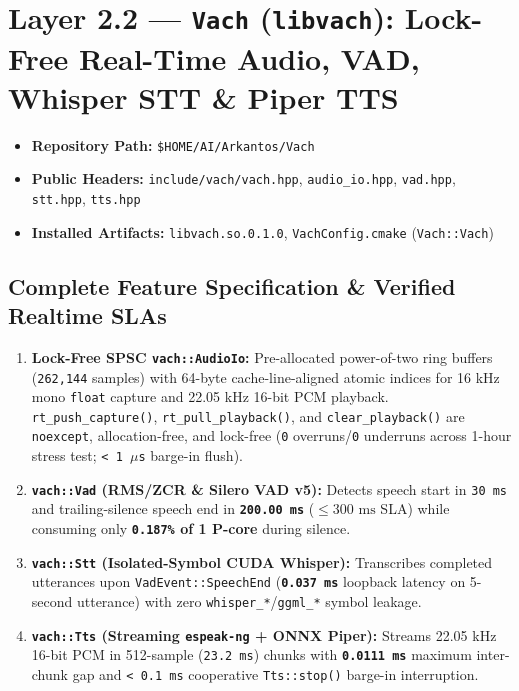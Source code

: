 \documentclass[11pt,a4paper]{article}
\begin{document}
\section{Layer 2.2 --- \texttt{Vach} (\texttt{libvach}): Lock-Free Real-Time Audio, VAD, Whisper STT \& Piper TTS}

\begin{itemize}[leftmargin=1.5em,itemsep=1pt]
  \item \textbf{Repository Path:} \texttt{\$HOME/AI/Arkantos/Vach}
  \item \textbf{Public Headers:} \texttt{include/vach/vach.hpp}, \texttt{audio\_io.hpp}, \texttt{vad.hpp}, \texttt{stt.hpp}, \texttt{tts.hpp}
  \item \textbf{Installed Artifacts:} \texttt{libvach.so.0.1.0}, \texttt{VachConfig.cmake} (\texttt{Vach::Vach})
\end{itemize}

\subsection{Complete Feature Specification \& Verified Realtime SLAs}
\begin{enumerate}[leftmargin=1.5em]
  \item \textbf{Lock-Free SPSC \texttt{vach::AudioIo}:} Pre-allocated power-of-two ring buffers (\texttt{262,144} samples) with 64-byte cache-line-aligned atomic indices for 16 kHz mono \texttt{float} capture and 22.05 kHz 16-bit PCM playback. \texttt{rt\_push\_capture()}, \texttt{rt\_pull\_playback()}, and \texttt{clear\_playback()} are \texttt{noexcept}, allocation-free, and lock-free (\texttt{0} overruns/\texttt{0} underruns across 1-hour stress test; \texttt{< 1 $\mu$s} barge-in flush).
  \item \textbf{\texttt{vach::Vad} (RMS/ZCR \& Silero VAD v5):} Detects speech start in \texttt{30 ms} and trailing-silence speech end in \textbf{\texttt{200.00 ms}} ($\le 300\text{ ms}$ SLA) while consuming only \textbf{\texttt{0.187\%} of 1 P-core} during silence.
  \item \textbf{\texttt{vach::Stt} (Isolated-Symbol CUDA Whisper):} Transcribes completed utterances upon \texttt{VadEvent::SpeechEnd} (\textbf{\texttt{0.037 ms}} loopback latency on 5-second utterance) with zero \texttt{whisper\_*}/\texttt{ggml\_*} symbol leakage.
  \item \textbf{\texttt{vach::Tts} (Streaming \texttt{espeak-ng} + ONNX Piper):} Streams 22.05 kHz 16-bit PCM in 512-sample (\texttt{23.2 ms}) chunks with \textbf{\texttt{0.0111 ms}} maximum inter-chunk gap and \texttt{< 0.1 ms} cooperative \texttt{Tts::stop()} barge-in interruption.
\end{enumerate}
\end{document}
